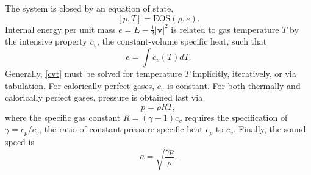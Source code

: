 The system is closed by an equation of state,
\begin{equation}
\left[p,T\right]=\mbox{EOS}\left(\rho,e\right).
\label{eos}
\end{equation}
Internal energy per
unit mass $e=E-\frac{1}{2}|\mathbf{v}|^2$ is related to gas temperature $T$ by the intensive property $c_v$, the constant-volume specific heat, such that
\begin{equation}
   e=\int c_v(T)dT.
   \label{cvt}
\end{equation}
Generally, \ref{cvt} must be solved for temperature $T$ implicitly, iteratively,
or via tabulation.
For calorically perfect gases, $c_v$ is constant. For both thermally and
calorically perfect gases, pressure is obtained last via
\begin{equation}
p=\rho R T,
\label{eos_tpg}
\end{equation}
where the specific gas constant $R=\left(\gamma-1\right)c_v$ requires the specification
of $\gamma=c_p/c_v$, the ratio of constant-pressure specific heat $c_p$ to $c_v$. Finally, the sound
speed is
\begin{equation}
a=\sqrt{\frac{\gamma p}{\rho}}.%
\label{asndtpg}
\end{equation}
